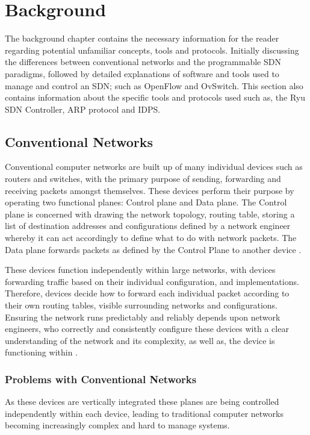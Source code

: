\documentclass[12pt, oneside]{book}
\begin{document}
\chapter{Background} 
The background chapter contains the necessary information for the reader regarding potential unfamiliar concepts, tools 
and protocols. Initially discussing the differences between conventional networks and the programmable SDN paradigms,
followed by detailed explanations of software and tools used to manage and control an SDN; such as OpenFlow and OvSwitch.
This section also contains information about the specific tools and protocols used such as, the Ryu SDN Controller,
ARP protocol and IDPS.


\section{Conventional Networks}
Conventional computer networks are built up of many individual devices such as routers and switches,
with the primary purpose of sending, forwarding and receiving packets amongst themselves. These devices perform
their purpose by operating two functional planes: Control plane and Data plane. 
The Control plane is concerned with drawing the network topology, routing table, storing a list of destination
addresses and configurations defined by a network engineer whereby
it can act accordingly to define what to do with network packets. The Data plane forwards packets as defined
by the Control Plane to another device \cite{ramos2015software}. \newline

These devices function independently within large networks, with devices forwarding traffic based on their individual configuration,
and implementations. Therefore, devices decide how to forward each individual packet
according to their own routing tables, visible surrounding networks and configurations. Ensuring the network runs
predictably and reliably depends upon network engineers, who correctly and consistently configure these devices
with a clear understanding of the network and its complexity, as well as, the device is
functioning within \cite{caldwell2004cutting}.

\subsection{Problems with Conventional Networks}
As these devices are vertically integrated these planes are being controlled independently within each device, leading to
traditional computer networks becoming increasingly complex and hard to manage systems.
\end{document}

